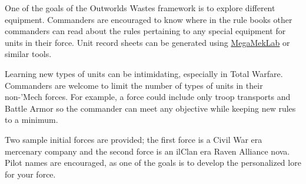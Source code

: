 \documentclass{article}
\begin{document}
One of the goals of the Outworlds Wastes framework is to explore different equipment.
Commanders are encouraged to know where in the rule books other commanders can read about the rules pertaining to any special equipment for units in their force.
Unit record sheets can be generated using \href{https://megamek.org}{MegaMekLab} or similar tools.

Learning new types of units can be intimidating, especially in Total Warfare.
Commanders are welcome to limit the number of types of units in their non-'Mech forces.
For example, a force could include only troop transports and Battle Armor so the commander can meet any objective while keeping new rules to a minimum.

\newpage

Two sample initial forces are provided; the first force is a Civil War era mercenary company and the second force is an ilClan era Raven Alliance nova.
Pilot names are encouraged, as one of the goals is to develop the personalized lore for your force.
\end{document}
